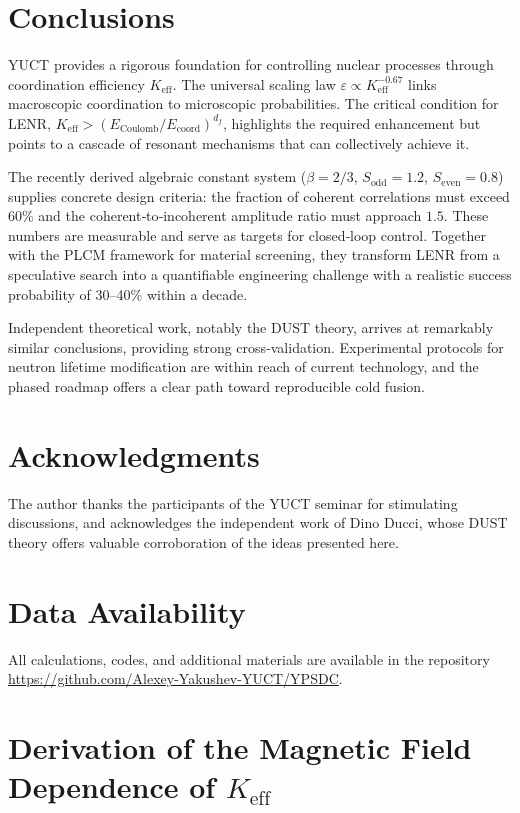 \documentclass[12pt]{article}
\theoremstyle{remark}
\newcommand{\Keff}{K_{\mathrm{eff}}}
\newcommand{\df}{d_{\!f}}
\newcommand{\Sodd}{S_{\mathrm{odd}}}
\newcommand{\Seven}{S_{\mathrm{even}}}
\begin{document}
	\section{Conclusions}
	\label{sec:conclusion}
	
	YUCT provides a rigorous foundation for controlling nuclear processes through coordination efficiency \(\Keff\). The universal scaling law \(\varepsilon \propto \Keff^{-0.67}\) links macroscopic coordination to microscopic probabilities. The critical condition for LENR, \(\Keff > (E_{\text{Coulomb}}/E_{\text{coord}})^{\df}\), highlights the required enhancement but points to a cascade of resonant mechanisms that can collectively achieve it.
	
	The recently derived algebraic constant system (\(\beta=2/3\), \(\Sodd=1.2\), \(\Seven=0.8\)) supplies concrete design criteria: the fraction of coherent correlations must exceed \(60\%\) and the coherent‑to‑incoherent amplitude ratio must approach \(1.5\). These numbers are measurable and serve as targets for closed‑loop control. Together with the PLCM framework for material screening, they transform LENR from a speculative search into a quantifiable engineering challenge with a realistic success probability of 30–40\% within a decade.
	
	Independent theoretical work, notably the DUST theory, arrives at remarkably similar conclusions, providing strong cross‑validation. Experimental protocols for neutron lifetime modification are within reach of current technology, and the phased roadmap offers a clear path toward reproducible cold fusion.
	
	\section*{Acknowledgments}
	The author thanks the participants of the YUCT seminar for stimulating discussions, and acknowledges the independent work of Dino Ducci, whose DUST theory offers valuable corroboration of the ideas presented here.
	
	\section*{Data Availability}
	All calculations, codes, and additional materials are available in the repository \url{https://github.com/Alexey-Yakushev-YUCT/YPSDC}.
	
	\appendix
	\section{Derivation of the Magnetic Field Dependence of \(\Keff\)}
	\label{app:B}
	
\end{document}
